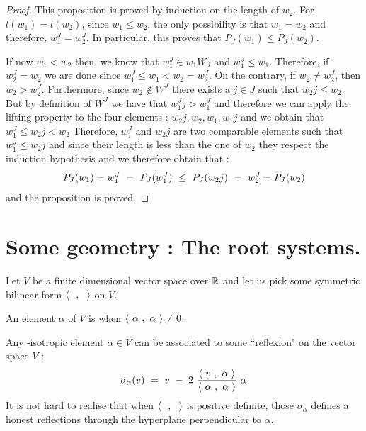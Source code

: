 \begin{proof}
	This proposition is proved by induction on the length of $w_2$. For $l(w_1)=l(w_2)$, since $w_1\leq w_2$, the only possibility is that $w_1=w_2$ and therefore,  $w_1^J=w_2^J$. In particular, this proves that $P_J(w_1)\leq P_J(w_2)$.

	If now $w_1<w_2$ then, we know that $w_1^J\in w_1W_J$ and $w_1^J\leq w_1$. Therefore, if $w_2^J=w_2$ we are done since $w_1^J\leq w_1<w_2=w_2^J$. On the contrary, if $w_2\not=w_2^J$, then $w_2 > w_2^J$. Furthermore, since $w_2\not\in W^J$ there exists a $j\in J$ such that $w_2j\leq w_2$. But by definition of $W^J$ we have that $w_1^Jj>w_1^J$ and therefore we can apply the lifting property to the four elements : $w_2j, w_2, w_1, w_1j$ and we obtain that $w_1^J\leq w_2j < w_2$ Therefore, $w_1^J$ and $w_2j$ are two comparable elements such that $w_1^J\leq w_2j$ and since their length is less than the one of $w_2$ they respect the induction hypothesis and we therefore obtain that :
	\begin{equation}
	P_J(w_1)=w_1^J\text{ }=\text{ } P_J(w_1^J)\text{ }\leq \text{ } P_J(w_2 j)\text{ }=\text{ } w_2^J=P_J(w_2)
	\end{equation}
	and the proposition is proved.
\end{proof}

\section{Some geometry : The root systems.}
Let $V$ be a finite dimensional vector space over $\mathbb R$ and let us pick some symmetric bilinear form $\langle\text{ } \text{ },\text{ }\text{ }\rangle$ on $V$.
\begin{definition}
	An element $\alpha$ of $V$ is  when $\langle\text{ } \alpha\text{ },\text{ }\alpha\text{ }\rangle\not=0$.
\end{definition}
Any -isotropic element $\alpha\in V$ can be associated to some ``reflexion" on the vector space $V$ :
\begin{equation}
\sigma_\alpha(v)\text{ }=\text{ } v\text{ } -\text{ } 2\text{ } \frac{\langle\text{ } v\text{ },\text{ }\alpha\text{ }\rangle}{\langle\text{ } \alpha\text{ },\text{ }\alpha\text{ }\rangle}\text{ }\alpha
\end{equation}
It is not hard to realise that when $\langle\text{ } \text{ },\text{ }\text{ }\rangle$ is positive definite, those $\sigma_\alpha$ defines a honest reflections through the hyperplane perpendicular to $\alpha$.

